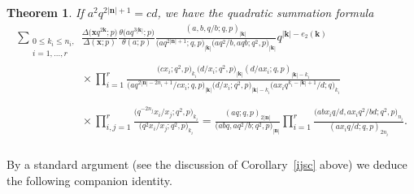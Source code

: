\documentclass[pdftex]{sigma}%
\numberwithin{equation}{section}
\newtheorem{Theorem}{Theorem}[section]
\newcommand\bn{\mathbf n}
\newcommand\bk{\mathbf k}
\newcommand\bx{\mathbf x}
\begin{document}
\begin{Theorem}\label{aqist}
If $a^2q^{2|\bn|+1}=cd$, we have the quadratic summation formula
\begin{gather*}
\sum_{\substack{0\leq k_i\leq n_i,\\i=1,\dots,r}}
\frac{\Delta\big(\bx q^{2\bk};p\big)}{\Delta(\bx;p)}
\frac{\theta\big(aq^{3|\bk|};p\big)}{\theta(a;p)}
\frac{(a,b,q/b;q,p)_{|\bk|}}{\big(aq^{2|\bn|+1};q,p\big)_{|\bk|}\big(aq^2/b,aqb;q^2,p\big)_{|\bk|}} q^{|\bk|-e_2(\bk)}
\\ \phantom{\sum_{\substack{0\leq k_i\leq n_i,\\i=1,\dots,r}}}{}
\times
\prod\limits_{i=1}^r\frac{\big(cx_i;q^2,p\big)_{k_i}\big(d/x_i;q^2,p\big)_{|\bk|}(d/ax_i;q,p)_{|\bk|-k_i}}
{\big(aq^{2|\bn|-2n_i+1}/cx_i;q,p\big)_{|\bk|}\big(d/x_i;q^2,p\big)_{|\bk|-k_i}\big(ax_iq^{k_i-|\bk|+1}/d;q\big)_{k_i}}
\\ \phantom{\sum_{\substack{0\leq k_i\leq n_i,\\i=1,\dots,r}}}{}
\times\prod\limits_{i,j=1}^r\frac{\big(q^{-2n_j}x_i/x_j;q^2,p\big)_{k_i}}{\big(q^2x_i/x_j;q^2,p\big)_{k_i}}
=\frac{(aq;q,p)_{2|\bn|}}{\big(abq,aq^2/b;q^2,p\big)_{|\bn|}}\prod\limits_{i=1}^r
\frac{\big(abx_iq/d,ax_iq^2/bd;q^2,p\big)_{n_i}}{(ax_iq/d;q,p)_{2n_i}}.
\end{gather*}
\end{Theorem}

By a standard argument (see the discussion of Corollary~\ref{ijsc} above) we deduce
 the following companion identity.
\end{document}
